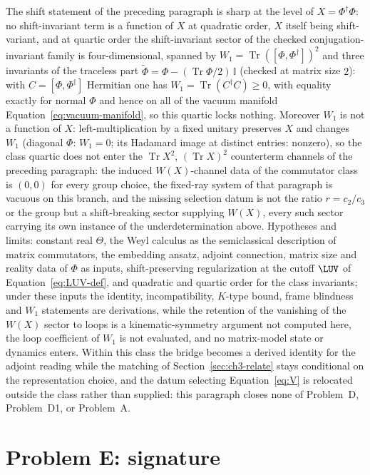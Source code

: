 The shift statement of the preceding paragraph is sharp at the level of \(X=\Phi^\dagger\Phi\): no shift-invariant term is a function of \(X\) at quadratic order, \(X\) itself being shift-variant, and at quartic order the shift-invariant sector of the checked conjugation-invariant family is four-dimensional, spanned by \(W_1=\operatorname{Tr}([\Phi,\Phi^\dagger])^2\) and three invariants of the traceless part \(\widetilde\Phi=\Phi-(\operatorname{Tr}\Phi/2)\,\mathbb I\) (checked at matrix size \(2\)): with \(C=[\Phi,\Phi^\dagger]\) Hermitian one has \(W_1=\operatorname{Tr}(C^\dagger C)\ge0\), with equality exactly for normal \(\Phi\) and hence on all of the vacuum manifold Equation~\eqref{eq:vacuum-manifold}, so this quartic locks nothing.
Moreover \(W_1\) is not a function of \(X\): left-multiplication by a fixed unitary preserves \(X\) and changes \(W_1\) (diagonal \(\Phi\): \(W_1=0\); its Hadamard image at distinct entries: nonzero), so the class quartic does not enter the \(\operatorname{Tr}X^2\), \((\operatorname{Tr}X)^2\) counterterm channels of the preceding paragraph: the induced \(W(X)\)-channel data of the commutator class is \((0,0)\) for every group choice, the fixed-ray system of that paragraph is vacuous on this branch, and the missing selection datum is not the ratio \(r=c_2/c_3\) or the group but a shift-breaking sector supplying \(W(X)\), every such sector carrying its own instance of the underdetermination above.
Hypotheses and limits: constant real \(\Theta\), the Weyl calculus as the semiclassical description of matrix commutators, the embedding ansatz, adjoint connection, matrix size and reality data of \(\Phi\) as inputs, shift-preserving regularization at the cutoff \(\LUV\) of Equation~\eqref{eq:LUV-def}, and quadratic and quartic order for the class invariants; under these inputs the identity, incompatibility, \(K\)-type bound, frame blindness and \(W_1\) statements are derivations, while the retention of the vanishing of the \(W(X)\) sector to loops is a kinematic-symmetry argument not computed here, the loop coefficient of \(W_1\) is not evaluated, and no matrix-model state or dynamics enters.
Within this class the bridge becomes a derived identity for the adjoint reading while the matching of Section~\ref{sec:ch3-relate} stays conditional on the representation choice, and the datum selecting Equation~\eqref{eq:V} is relocated outside the class rather than supplied: this paragraph closes none of Problem~D, Problem~D1, or Problem~A.

\section{Problem E: signature}
\label{sec:status-E}

